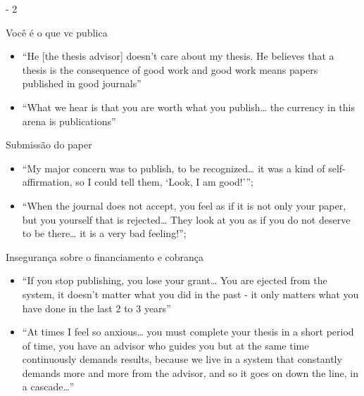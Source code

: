 \documentclass[bigger]{beamer}
\begin{document}
\begin{frame}[label={sec:org0a0392c}]{\cite{demeis2003} - 2}
\begin{block}{Você é o que vc publica}
\begin{itemize}
\item “He [the thesis advisor] doesn’t care about my thesis. He believes that a thesis is the consequence of good work and good work means papers published in good journals”

\item “What we hear is that you are worth what you publish\ldots{} the currency in this arena is publications”
\end{itemize}
\end{block}

\begin{block}{Submissão do paper}
\begin{itemize}
\item “My major concern was to publish, to be recognized\ldots{} it was a kind of self-affirmation, so I could tell them, ‘Look, I am good!’”;

\item “When the journal does not accept, you feel as if it is not only your paper, but you yourself that is rejected\ldots{} They look at you as if you do not deserve to be there\ldots{} it is a very bad feeling!”;
\end{itemize}
\end{block}


\begin{block}{Insegurança sobre o financiamento e cobrança}
\begin{itemize}
\item “If you stop publishing, you lose your grant\ldots{} You are ejected from the system, it doesn’t matter what you did in the past - it only matters what you have done in the last 2 to 3 years”

\item “At times I feel so anxious\ldots{} you must complete your thesis in a short period of time, you have an advisor who guides you but at the same time continuously demands results, because we live in a system that constantly demands more and more from the advisor, and so it goes on down the line, in a cascade\ldots{}”
\end{itemize}
\end{block}
\end{frame}
\end{document}
